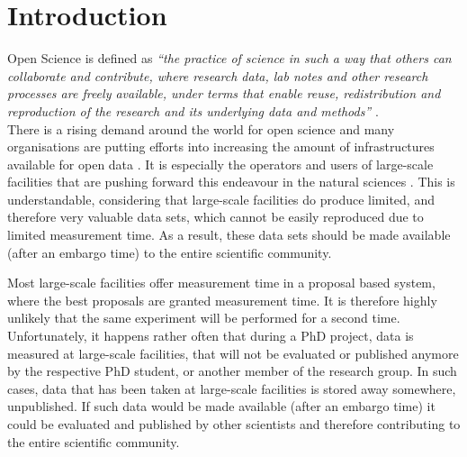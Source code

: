 \documentclass[aps,prx,reprint,amsmath,amssymb,superscriptaddress,showpacs]{revtex4-1}
\begin{document}
\maketitle



\section{Introduction}

Open Science is defined as \emph{``the practice of science in such a way that others can collaborate and contribute, where research data, lab notes and other research processes are freely available, under terms that enable reuse, redistribution and reproduction of the research and its underlying data and methods''} \cite{foster}.\\

There is a rising demand around the world for open science and many organisations are putting efforts into increasing the amount of infrastructures available for open data \cite{plos, sharing, panosc, nfdi, expands}. 
It is especially the operators and users of large-scale facilities that are pushing forward this endeavour in the natural sciences \cite{panosc, nfdi, expands}.
This is understandable, considering that large-scale facilities do produce limited, and therefore very valuable data sets, which cannot be easily reproduced due to limited measurement time. As a result, these data sets should be made available (after an embargo time) to the entire scientific community. 

Most large-scale facilities offer measurement time in a proposal based system, where the best proposals are granted measurement time.
It is therefore highly unlikely that the same experiment will be performed for a second time. 
Unfortunately, it happens rather often that during a PhD project, data is measured at large-scale facilities, that will not be evaluated or published anymore by the respective PhD student, or another member of the research group.
In such cases, data that has been taken at large-scale facilities is stored away somewhere, unpublished.
If such data would be made available (after an embargo time) it could be evaluated and published by other scientists and therefore contributing to the entire scientific community.
\end{document}
